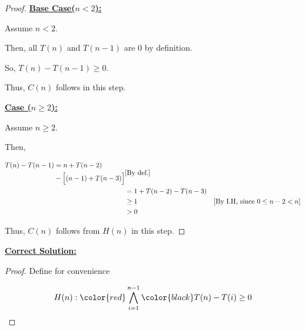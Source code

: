 \documentclass[12pt]{article}
\begin{document}
\begin{itemize}
\begin{proof}
        \bigskip

        \underline{\textbf{Base Case($n < 2$):}}

        \bigskip

        Assume $n < 2$.

        \bigskip

        Then, all $T(n)$ and $T(n-1)$ are 0 by definition.

        \bigskip

        So, $T(n) - T(n-1) \geq 0$.

        \bigskip

        Thus, $C(n)$ follows in this step.

        \bigskip

        \underline{\textbf{Case ($n \geq 2$):}}

        \bigskip

        Assume $n \geq 2$.

        \bigskip

        Then,

        \begin{align}
        \begin{split}
        T(n) - T(n-1) &= n + T(n-2)\\
        &- \Bigl[(n-1) + T(n-3) \Bigr]
        \end{split} & [\text{By def.}]\\
        &= 1 + T(n-2) - T(n-3)\\
        &\geq 1 & [\text{By I.H, since $0 \leq n-2 < n$}]\\
        &> 0
        \end{align}

        \bigskip

        Thus, $C(n)$ follows from $H(n)$ in this step.
    \end{proof}

    \bigskip

    \begin{mdframed}
        \underline{\textbf{Correct Solution:}}

        \setcounter{equation}{0}

    \begin{proof}
        Define for convenience

        \begin{align}
            H(n): \color{red}\bigwedge\limits_{i=1}^{n-1}\color{black} T(n) - T(i) \geq 0
        \end{align}


\end{proof}
\end{mdframed}
\end{itemize}
\end{document}
